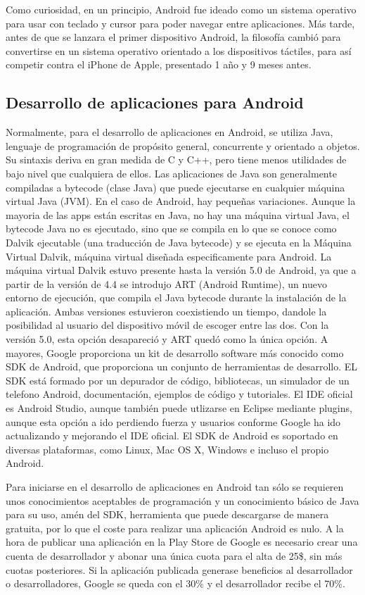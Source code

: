 \documentclass[
10pt, %
a4paper, %
oneside, %
headinclude,footinclude, %
BCOR5mm, %
]{scrartcl}
\begin{document}
Como curiosidad, en un principio, Android fue ideado como un sistema operativo para usar con teclado y cursor para poder navegar entre aplicaciones. Más tarde, antes de que se lanzara el primer dispositivo Android, la filosofía cambió para convertirse en un sistema operativo orientado a los dispositivos táctiles, para así competir contra el iPhone de Apple, presentado 1 año y 9 meses antes.

\subsection{Desarrollo de aplicaciones para Android}
Normalmente, para el desarrollo de aplicaciones en Android, se utiliza Java, lenguaje de programación de propósito general, concurrente y orientado a objetos. Su sintaxis deriva en gran medida de C y C++, pero tiene menos utilidades de bajo nivel que cualquiera de ellos. Las aplicaciones de Java son generalmente compiladas a bytecode (clase Java) que puede ejecutarse en cualquier máquina virtual Java (JVM). En el caso de Android, hay pequeñas variaciones. Aunque la mayoria de las apps están escritas en Java, no hay una máquina virtual Java, el bytecode Java no es ejecutado, sino que se compila en lo que se conoce como Dalvik ejecutable (una traducción de Java bytecode) y se ejecuta en la Máquina Virtual Dalvik, máquina virtual diseñada especificamente para Android. La máquina virtual Dalvik estuvo presente hasta la versión 5.0 de Android, ya que a partir de la versión de 4.4 se introdujo ART (Android Runtime), un nuevo entorno de ejecución, que compila el Java bytecode durante la instalación de la aplicación. Ambas versiones estuvieron coexistiendo un tiempo, dandole la posibilidad al usuario del dispositivo móvil de escoger entre las dos. Con la versión 5.0, esta opción desapareció y ART quedó como la única opción. A mayores, Google proporciona un kit de desarrollo software más conocido como SDK de Android, que proporciona un conjunto de herramientas de desarrollo. EL SDK está formado por un depurador de código, bibliotecas, un simulador de un telefono Android, documentación, ejemplos de código y tutoriales. El IDE oficial es Android Studio, aunque también puede utlizarse en Eclipse mediante plugins, aunque esta opción a ido perdiendo fuerza y usuarios conforme Google ha ido actualizando y mejorando el IDE oficial. El SDK de Android es soportado en diversas plataformas, como Linux, Mac OS X, Windows e incluso el propio Android.

Para iniciarse en el desarrollo de aplicaciones en Android tan sólo se requieren unos conocimientos aceptables de programación y un conocimiento básico de Java para su uso, amén del SDK, herramienta que puede descargarse de manera gratuita, por lo que el coste para realizar una aplicación Android es nulo. A la hora de publicar una aplicación en la Play Store de Google es necesario crear una cuenta de desarrollador y abonar una única cuota para el alta de 25\$, sin más cuotas posteriores. Si la aplicación publicada generase beneficios al desarrollador o desarrolladores, Google se queda con el 30\% y el desarrollador recibe el 70\%.
\end{document}
